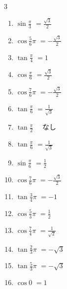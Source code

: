 \begin{multicols}{3}
\begin{enumerate}
  \item $\displaystyle \sin{\frac{\pi}{3}}$
        $\displaystyle =\frac{\sqrt{3}}{2}$

  \item $\displaystyle \cos{\frac{5}{6}\pi}$
        $\displaystyle =-\frac{\sqrt{3}}{2}$

  \item $\displaystyle \tan{\frac{\pi}{4}}$
        $\displaystyle =1$

  \item $\displaystyle \cos{\frac{\pi}{6}}$
        $\displaystyle =\frac{\sqrt{3}}{2}$

  \item $\displaystyle \cos{\frac{7}{6}\pi}$
        $\displaystyle =-\frac{\sqrt{3}}{2}$

  \item $\displaystyle \tan{\frac{\pi}{6}}$
        $\displaystyle =\frac{1}{\sqrt{3}}$

  \item $\displaystyle \tan{\frac{\pi}{2}}$
        $\displaystyle \quad なし$

  \item $\displaystyle \tan{\frac{\pi}{6}}$
        $\displaystyle =\frac{1}{\sqrt{3}}$

  \item $\displaystyle \sin{\frac{\pi}{6}}$
        $\displaystyle =\frac{1}{2}$

  \item $\displaystyle \cos{\frac{7}{6}\pi}$
        $\displaystyle =-\frac{\sqrt{3}}{2}$

  \item $\displaystyle \tan{\frac{3}{4}\pi}$
        $\displaystyle =-1$

  \item $\displaystyle \cos{\frac{5}{3}\pi}$
        $\displaystyle =\frac{1}{2}$

  \item $\displaystyle \cos{\frac{7}{4}\pi}$
        $\displaystyle =\frac{1}{\sqrt{2}}$

  \item $\displaystyle \tan{\frac{2}{3}\pi}$
        $\displaystyle =-\sqrt{3}$

  \item $\displaystyle \tan{\frac{5}{3}\pi}$
        $\displaystyle =-\sqrt{3}$

  \item $\displaystyle \cos{0}$
        $\displaystyle =1$


\end{enumerate}
\end{multicols}
